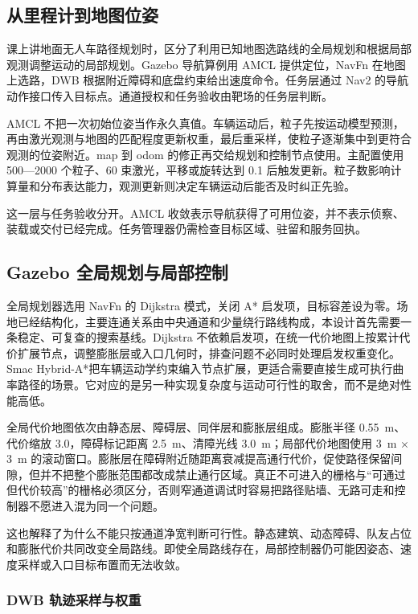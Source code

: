 \subsection{从里程计到地图位姿}\label{sec:2.2}

课上讲地面无人车路径规划时，区分了利用已知地图选路线的全局规划和根据局部观测调整运动的局部规划\cite{ref2}。Gazebo 导航算例用 AMCL 提供定位，NavFn 在地图上选路，DWB 根据附近障碍和底盘约束给出速度命令。任务层通过 Nav2 的导航动作接口传入目标点\cite{ref10}。通道授权和任务验收由靶场的任务层判断。

AMCL 不把一次初始位姿当作永久真值。车辆运动后，粒子先按运动模型预测，再由激光观测与地图的匹配程度更新权重，最后重采样，使粒子逐渐集中到更符合观测的位姿附近。map 到 odom 的修正再交给规划和控制节点使用。主配置使用 500—2000 个粒子、60 束激光，平移或旋转达到 0.1 后触发更新。粒子数影响计算量和分布表达能力，观测更新则决定车辆运动后能否及时纠正先验。

这一层与任务验收分开。AMCL 收敛表示导航获得了可用位姿，并不表示侦察、装载或交付已经完成。任务管理器仍需检查目标区域、驻留和服务回执。

\subsection{Gazebo 全局规划与局部控制}\label{sec:2.3}

全局规划器选用 NavFn 的 Dijkstra 模式，关闭 A* 启发项，目标容差设为零。场地已经结构化，主要连通关系由中央通道和少量绕行路线构成，本设计首先需要一条稳定、可复查的搜索基线。Dijkstra 不依赖启发项，在统一代价地图上按累计代价扩展节点，调整膨胀层或入口几何时，排查问题不必同时处理启发权重变化。Smac Hybrid-A*把车辆运动学约束编入节点扩展，更适合需要直接生成可执行曲率路径的场景。它对应的是另一种实现复杂度与运动可行性的取舍，而不是绝对性能高低。

全局代价地图依次由静态层、障碍层、同伴层和膨胀层组成。膨胀半径 0.55~m、代价缩放 3.0，障碍标记距离 2.5~m、清障光线 3.0~m；局部代价地图使用 3~m \ensuremath{\times} 3~m 的滚动窗口。膨胀层在障碍附近随距离衰减提高通行代价，促使路径保留间隙，但并不把整个膨胀范围都改成禁止通行区域。真正不可进入的栅格与“可通过但代价较高”的栅格必须区分，否则窄通道调试时容易把路径贴墙、无路可走和控制器不愿进入混为同一个问题。

这也解释了为什么不能只按通道净宽判断可行性。静态建筑、动态障碍、队友占位和膨胀代价共同改变全局路线。即使全局路线存在，局部控制器仍可能因姿态、速度采样或入口目标布置而无法收敛。

\subsubsection*{DWB 轨迹采样与权重}

